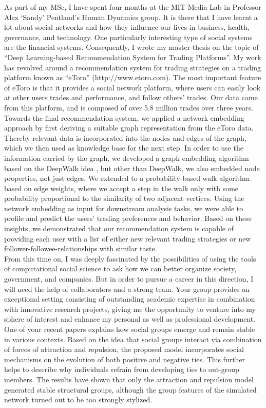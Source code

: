 As part of my MSc, I have spent four months at the MIT Media Lab in Professor Alex `Sandy' Pentland's Human Dynamics group. 
It is there that I have learnt a lot about social networks and how they influence our lives in business, health, governance, and technology.
One particularly interesting type of social systems are the financial systems.
Consequently, I wrote my master thesis on the topic of ``Deep Learning-based Recommendation System for Trading Platforms''. 
My work has revolved around a recommendation system for trading strategies on a trading platform known as ``eToro'' (http://www.etoro.com).
The most important feature of eToro is that it provides a social network platform, where users can easily look at other users trades and performance, and follow others’ trades. 
Our data came from this platform, and is composed of over 5.8 million trades over three years.  
Towards the final recommendation system, we applied a network embedding approach by first deriving a suitable graph representation from the eToro data.
Thereby relevant data is incorporated into the nodes and edges of the graph, which we then used as knowledge base for the next step.
In order to use the information carried by the graph, we developed a graph embedding algorithm based on the DeepWalk idea \cite{perozzi2014deepwalk}, but other than DeepWalk, we also embedded node properties, not just edges.
We extended to a probability-based walk algorithm based on edge weights, where we accept a step in the walk only with some probability proportional to the similarity of two adjacent vertices.
Using the network embedding as input for downstream analysis tasks, we were able to profile and predict the users' trading preferences and behavior. 
Based on these insights, we demonstrated that our recommendation system is capable of providing each user with a list of either new relevant trading strategies or new follower-followee-relationships with similar taste.\\

From this time on, I was deeply fascinated by the possibilities of using the tools of computational social science to ask how we can better organize society, government, and companies. 
But in order to pursue a career in this direction, I will need the help of collaborators and a strong team. 
Your group provides an exceptional setting consisting of outstanding academic expertise in combination with innovative research projects, giving me the opportunity to venture into my sphere of interest and enhance my personal as well as professional development.
One of your recent papers \cite{stadtfeld2020emergence} explains how social groups emerge and remain stable in various contexts.
Based on the idea that social groups interact via combination of forces of attraction and repulsion, the proposed model incorporates social mechanisms on the evolution of both positive and negative ties.
This further helps to describe why individuals refrain from developing ties to out-group members.
The results have shown that only the attraction and repulsion model generated stable structural groups, although the group features of the simulated network turned out to be too strongly stylized.\\

